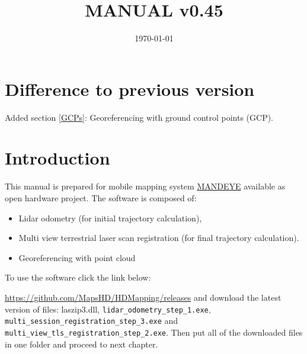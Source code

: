 \documentclass[a4paper,12pt]{book}
\begin{document}
\author{}
\title{MANUAL v0.45}
\date{\today}

\frontmatter
\maketitle
\tableofcontents

\mainmatter

\chapter{Difference to previous version}
Added section \ref{GCPs}: Georeferencing with ground control points (GCP).

\chapter{Introduction}
This manual is prepared for mobile mapping system \href{https://github.com/JanuszBedkowski/mandeye_controller/blob/main/doc/manual/manual_v0_2/mandeye_dev_manual_v0_2.pdf}{MANDEYE} available as open hardware project.
The software is composed of:
\begin{itemize}
	\item Lidar odometry (for initial trajectory calculation),
	\item Multi view terrestrial laser scan registration (for final trajectory calculation).
	\item Georeferencing with point cloud
\end{itemize}
To use the software click the link below:

\url{https://github.com/MapsHD/HDMapping/releases}
\linebreak
and download the latest version of files: laszip3.dll, \verb|lidar_odometry_step_1.exe|, \verb|multi_session_registration_step_3.exe|  and \verb|multi_view_tls_registration_step_2.exe|.
Then put all of the downloaded files in one folder and proceed to next chapter.













\backmatter
\end{document}
